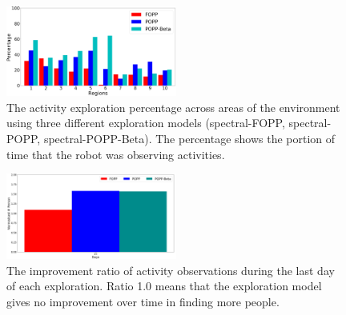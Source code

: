 \begin{figure}[t!]
	\centering
	\includegraphics[width=0.5\textwidth]{./figures/exploration_percentage_region.png}
	\caption{The activity exploration percentage across areas of the environment using three different exploration models (spectral-FOPP, spectral-POPP, spectral-POPP-Beta). The percentage shows the portion of time that the robot was observing activities.}
	\label{fig:exploration_percentage_region}
\end{figure}



\begin{figure}[t!]
	\centering
	\includegraphics[width=0.5\textwidth]{./figures/exploration_improvement_ratio_last_day.png}
	\caption{The improvement ratio of activity observations during the last day of each exploration. Ratio 1.0 means that the exploration model gives no improvement over time in finding more people.}
	\label{fig:exploration_improvement_ratio_last_day}
\end{figure}


